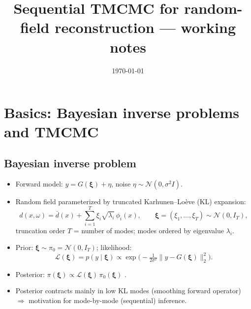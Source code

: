 \documentclass[11pt,a4paper]{article}
\title{Sequential TMCMC for random-field reconstruction --- working notes}
\author{}
\date{\today}
\newcommand{\bxi}{\boldsymbol{\xi}}          %
\newcommand{\bL}{\mathcal{L}}                 %
\newcommand{\bpi}{\pi}                        %
\begin{document}
\maketitle
\tableofcontents

\section{Basics: Bayesian inverse problems and TMCMC}

\subsection{Bayesian inverse problem}
\begin{itemize}
  \item Forward model: $y = G(\bxi) + \eta$, noise $\eta \sim \mathcal{N}(0,\sigma^2 I)$.
  \item Random field parameterized by truncated Karhunen--Loève (KL) expansion:
    \begin{equation}
      d(x,\omega) = \bar d(x) + \sum_{i=1}^{T} \xi_i \sqrt{\lambda_i}\,\phi_i(x),
      \qquad \bxi = (\xi_1,\dots,\xi_T) \sim \mathcal{N}(0, I_T),
    \end{equation}
    truncation order $T$ = number of modes; modes ordered by eigenvalue $\lambda_i$.
  \item Prior: $\bxi \sim \bpi_0 = \mathcal{N}(0,I_T)$; likelihood:
    \begin{equation}
      \bL(\bxi) = p(y \mid \bxi) \propto \exp\!\Big(-\tfrac{1}{2\sigma^2}\|y - G(\bxi)\|_2^2\Big).
    \end{equation}
  \item Posterior: $\bpi(\bxi) \propto \bL(\bxi)\,\bpi_0(\bxi)$ \cite{stuartInverseProblemsBayesian2010}.
  \item Posterior contracts mainly in low KL modes (smoothing forward operator) \cite{stuartInverseProblemsBayesian2010} $\Rightarrow$ motivation for mode-by-mode (sequential) inference.
\end{itemize}
\end{document}
